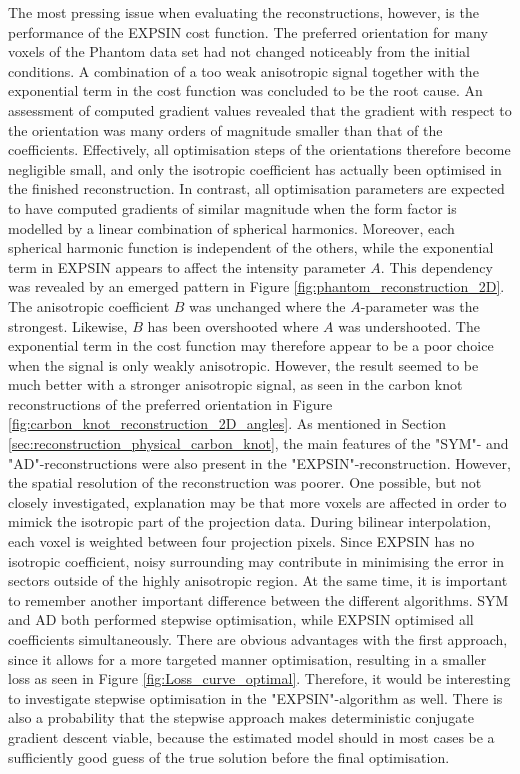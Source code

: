 The most pressing issue when evaluating the reconstructions, however, is the performance of the EXPSIN cost function.
The preferred orientation for many voxels of the Phantom data set had not changed noticeably from the initial conditions.
A combination of a too weak anisotropic signal together with the exponential term in the cost function was concluded to be the root cause.
An assessment of computed gradient values revealed that the gradient with respect to the orientation was many orders of magnitude smaller than that of the coefficients.
Effectively, all optimisation steps of the orientations therefore become negligible small, and only the isotropic coefficient has actually been optimised in the finished reconstruction.
In contrast, all optimisation parameters are expected to have computed gradients of similar magnitude when the form factor is modelled by a linear combination of spherical harmonics.
Moreover, each spherical harmonic function is independent of the others, while the exponential term in EXPSIN appears to affect the intensity parameter $A$.
This dependency was revealed by an emerged pattern in Figure \ref{fig:phantom_reconstruction_2D}. The anisotropic coefficient $B$ was unchanged where the $A$-parameter was the strongest.
Likewise, $B$ has been overshooted where $A$ was undershooted.
The exponential term in the cost function may therefore appear to be a poor choice when the signal is only weakly anisotropic.
However, the result seemed to be much better with a stronger anisotropic signal, as seen in the carbon knot reconstructions of the preferred orientation in Figure \ref{fig:carbon_knot_reconstruction_2D_angles}.
As mentioned in Section \ref{sec:reconstruction_physical_carbon_knot},
the main features of the "SYM"- and "AD"-reconstructions were also present in the "EXPSIN"-reconstruction.
However, the spatial resolution of the reconstruction was poorer.
One possible, but not closely investigated, explanation may be that more voxels are affected in order to mimick the isotropic part of the projection data.
During bilinear interpolation, each voxel is weighted between four projection pixels.
Since EXPSIN has no isotropic coefficient, noisy surrounding may contribute in minimising the error in sectors outside of the highly anisotropic region.
At the same time, it is important to remember another important difference between the different algorithms.
SYM and AD both performed stepwise optimisation, while EXPSIN optimised all coefficients simultaneously.
There are obvious advantages with the first approach, since it allows for a more targeted manner optimisation, resulting in a smaller loss as seen in Figure \ref{fig:Loss_curve_optimal}.
Therefore, it would be interesting to investigate stepwise optimisation in the "EXPSIN"-algorithm as well.
There is also a probability that the stepwise approach makes deterministic conjugate gradient descent viable,
because the estimated model should in most cases be a sufficiently good guess of the true solution before the final optimisation.


